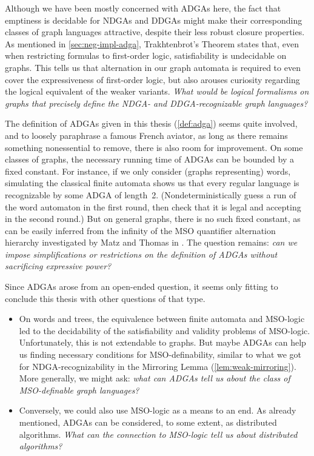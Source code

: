 \documentclass[a4paper,11pt,twoside]{report} \pdfoutput=1
\begin{document}
\begin{description}[style=nextline]
\item[Logics Equivalent to NDGAs and DDGAs.] Although we have been
  mostly concerned with ADGAs here, the fact that emptiness is
  decidable for NDGAs and DDGAs might make their corresponding classes
  of graph languages attractive, despite their less robust closure
  properties. As mentioned in \cref{sec:neg-impl-adga}, Trakhtenbrot’s
  Theorem states that, even when restricting formulas to first-order
  logic, satisfiability is undecidable on graphs. This tells us that
  alternation in our graph automata is required to even cover the
  expressiveness of first-order logic, but also arouses curiosity
  regarding the logical equivalent of the weaker variants. \emph{What
    would be logical formalisms on graphs that precisely define the
    NDGA- and DDGA-recognizable graph languages?}
\item[Alternative Definitions of ADGAs.] The definition of ADGAs given
  in this thesis (\cref{def:adga}) seems quite involved, and to
  loosely paraphrase a famous French aviator, as long as there remains
  something nonessential to remove, there is also room for
  improvement. On some classes of graphs, the necessary running time
  of ADGAs can be bounded by a fixed constant. For instance, if we
  only consider (graphs representing) words, simulating the classical
  finite automata shows us that every regular language is recognizable
  by some ADGA of length~2. (Nondeterministically guess a run of the
  word automaton in the first round, then check that it is legal and
  accepting in the second round.) But on general graphs, there is no
  such fixed constant, as can be easily inferred from the infinity of
  the MSO quantifier alternation hierarchy investigated by Matz and
  Thomas in \cite{MT97}. The question remains: \emph{can we impose
    simplifications or restrictions on the definition of ADGAs without
    sacrificing expressive power?}
\item[Impact on other Research.] Since ADGAs arose from an open-ended
  question, it seems only fitting to conclude this thesis with other
  questions of that type.
  \begin{itemize}
  \item On words and trees, the equivalence between finite automata
    and MSO-logic led to the decidability of the satisfiability and
    validity problems of MSO-logic. Unfortunately, this is not
    extendable to graphs. But maybe ADGAs can help us finding
    necessary conditions for MSO-definability, similar to what we got
    for NDGA-recognizability in the Mirroring Lemma
    (\cref{lem:weak-mirroring}). More generally, we might ask:
    \emph{what can ADGAs tell us about the class of MSO-definable
      graph languages?}
  \item Conversely, we could also use MSO-logic as a means to an
    end. As already mentioned, ADGAs can be considered, to some
    extent, as distributed algorithms. \emph{What can the connection
      to MSO-logic tell us about distributed algorithms?}
  \end{itemize}
\end{description} 
\end{document}
